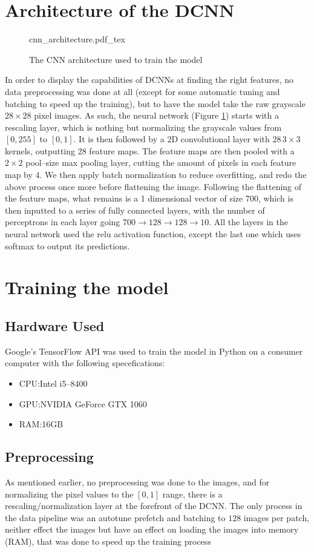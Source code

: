 \documentclass[conference]{IEEEtran}
\begin{document}
\section{Architecture of the DCNN}\label{sec:train}
\begin{figure}[!htp]
    \centering
    \def\svgwidth{\columnwidth}
    \scriptsize
    {cnn_architecture.pdf_tex}
    \caption{The CNN architecture used to train the model}\label{fig:cnn_architecture}
\end{figure}
In order to display the capabilities of DCNNs at finding the right features, no data preprocessing was done at all (except for some automatic tuning and batching to speed up the training), but to have the model take the raw grayscale $28 \times 28$ pixel images.\@
As such, the neural network (Figure \ref{fig:cnn_architecture}) starts with a rescaling layer, which is nothing but normalizing the grayscale values from $[0, 255]$ to $[0, 1]$. It is then followed by a 2D convolutional layer with $28 \, 3 \times 3$ kernels, outputting 28 feature maps. The feature maps are then pooled with a $2 \times 2$ pool--size max pooling layer, cutting the amount of pixels in each feature map by $4$. We then apply batch normalization\cite{batchnorm} to reduce overfitting, and redo the above process once more before flattening the image.\@
Following the flattening of the feature maps, what remains is a 1 dimensional vector of size 700, which is then inputted to a series of fully connected layers, with the number of perceptrons in each layer going $700 \to 128 \to 128 \to 10$. All the layers in the neural network used the relu activation function, except the last one which uses softmax to output its predictions.
\section{Training the model}
\subsection{Hardware Used}
Google's TensorFlow API\cite{tensorflow2015-whitepaper} was used to train the model in Python on a consumer computer with the following specefications:
\begin{itemize}
    \item CPU:\@ Intel i5--8400
    \item GPU:\@ NVIDIA GeForce GTX 1060
    \item RAM:\@ 16GB
\end{itemize}
\subsection{Preprocessing}
As mentioned earlier, no preprocessing was done to the images, and for normalizing the pixel values to the $[0, 1]$ range, there is a rescaling/normalization layer at the forefront of the DCNN. The only process in the data pipeline was an autotune prefetch and batching to $128$ images per patch, neither effect the images but have an effect on loading the images into memory (RAM), that was done to speed up the training process
\end{document}

